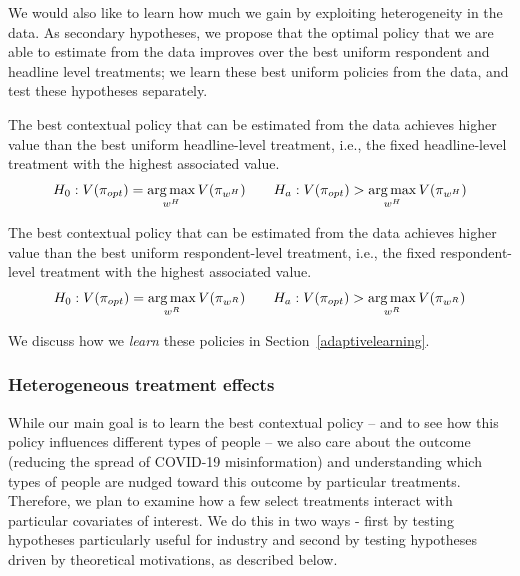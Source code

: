 \documentclass[letterpaper, 12pt, parskip=full,DIV=10]{scrartcl}
\begin{document}
We would also like to learn how much we gain by exploiting heterogeneity in the data. As secondary hypotheses, we propose that the optimal policy that we are able to estimate from the data improves over the best uniform respondent and headline level treatments; we learn these best uniform policies from the data, and test these hypotheses separately. 
\setcounter{hypothesis}{2}
  \begin{subhyp}
  The best contextual policy that can be estimated from the data achieves higher value than the best uniform headline-level treatment, i.e., the fixed headline-level treatment with the highest associated value. 
  \label{eq:optheadline}
\begin{align}
  H_{0}: V(\pi_{opt}) = \operatorname*{arg\,max}_{w^H} V(\pi_{w^H}) \qquad H_{a}:  V(\pi_{opt}) > \operatorname*{arg\,max}_{w^H} V(\pi_{w^H})
\end{align}
\end{subhyp}

  \begin{subhyp}
 The best contextual policy that can be estimated from the data achieves higher value than the best uniform respondent-level treatment, i.e., the fixed respondent-level treatment with the highest associated value. 
\begin{align}
  H_{0}: V(\pi_{opt}) = \operatorname*{arg\,max}_{w^R} V(\pi_{w^R}) \qquad H_{a}:  V(\pi_{opt}) > \operatorname*{arg\,max}_{w^R} V(\pi_{w^R})
\end{align}
\end{subhyp}

We discuss how we \textit{learn} these policies in Section~\ref{adaptivelearning}. 


\subsubsection{Heterogeneous treatment effects}\label{policieshte}

While our main goal is to learn the best contextual policy -- and to see how this policy influences different types of people -- we also care about the outcome (reducing the spread of COVID-19 misinformation) and understanding which types of people are nudged toward this outcome by particular treatments. Therefore, we plan to examine how a few select treatments interact with particular covariates of interest. We do this in two ways - first by testing hypotheses particularly useful for industry and second by testing hypotheses driven by theoretical motivations, as described below.
\end{document}
